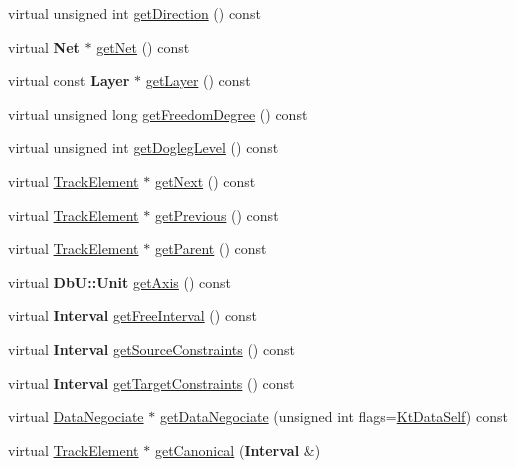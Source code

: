 \begin{DoxyCompactItemize}
\item 
virtual unsigned int \hyperlink{classKite_1_1TrackSegment_a09d03fbca9ab891c2f25bdae7f89a899}{get\-Direction} () const 
\item 
virtual {\bf Net} $\ast$ \hyperlink{classKite_1_1TrackSegment_adf3e1a980233163de0ca34a5c3575998}{get\-Net} () const 
\item 
virtual const {\bf Layer} $\ast$ \hyperlink{classKite_1_1TrackSegment_a304ee4e02745811e04ac6fb688bf834f}{get\-Layer} () const 
\item 
virtual unsigned long \hyperlink{classKite_1_1TrackSegment_a9f20f94d2d8aaa38c2b9ead5275ead27}{get\-Freedom\-Degree} () const 
\item 
virtual unsigned int \hyperlink{classKite_1_1TrackSegment_ace669b962e7df815b92fe70e1f4ad755}{get\-Dogleg\-Level} () const 
\item 
virtual \hyperlink{classKite_1_1TrackElement}{Track\-Element} $\ast$ \hyperlink{classKite_1_1TrackSegment_a5af0ac91c558873fea9703e7ab6f48df}{get\-Next} () const 
\item 
virtual \hyperlink{classKite_1_1TrackElement}{Track\-Element} $\ast$ \hyperlink{classKite_1_1TrackSegment_acbb9c965449bf4502d71149563cec0a2}{get\-Previous} () const 
\item 
virtual \hyperlink{classKite_1_1TrackElement}{Track\-Element} $\ast$ \hyperlink{classKite_1_1TrackSegment_ad1a03a36d5908ce44c3d0391ff9c7103}{get\-Parent} () const 
\item 
virtual {\bf Db\-U\-::\-Unit} \hyperlink{classKite_1_1TrackSegment_af85576c58c70007850ad56e238e8d266}{get\-Axis} () const 
\item 
virtual {\bf Interval} \hyperlink{classKite_1_1TrackSegment_a38d30a241d00a14943a06401d0d12923}{get\-Free\-Interval} () const 
\item 
virtual {\bf Interval} \hyperlink{classKite_1_1TrackSegment_a972921aeb7f907194710ea35ac7600be}{get\-Source\-Constraints} () const 
\item 
virtual {\bf Interval} \hyperlink{classKite_1_1TrackSegment_a00d398bdc1837c6c1e4847895c557829}{get\-Target\-Constraints} () const 
\item 
virtual \hyperlink{classKite_1_1DataNegociate}{Data\-Negociate} $\ast$ \hyperlink{classKite_1_1TrackSegment_a76a45d5701f875711a03692e9bf6d5ce}{get\-Data\-Negociate} (unsigned int flags=\hyperlink{namespaceKite_acca8fffa3182dea5f94208f454f14b47a68e917ff37d4b5cef906303181836404}{Kt\-Data\-Self}) const 
\item 
virtual \hyperlink{classKite_1_1TrackElement}{Track\-Element} $\ast$ \hyperlink{classKite_1_1TrackSegment_af2d46d64cbd02bdbba53d5483d95e26d}{get\-Canonical} ({\bf Interval} \&)

\end{DoxyCompactItemize}
